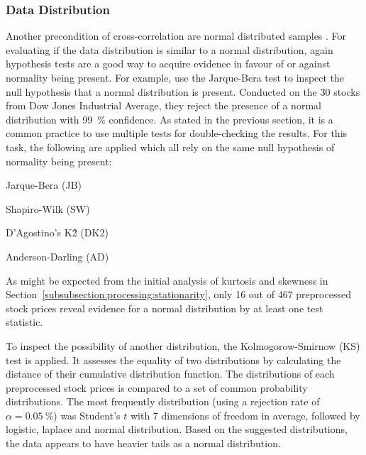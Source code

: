 \subsubsection{Data Distribution}
\label{subsubsection:normal_dist}


Another precondition of cross-correlation are normal distributed samples \cite{Bishara2012TestingApproaches}. For evaluating if the data distribution is similar to a normal distribution, again hypothesis tests are a good way to acquire evidence in favour of or against normality being present. For example, \citet{Vlastakis2012InformationVolatility} use the Jarque-Bera test \cite{Jarque1980EfficientResiduals} to inspect the null hypothesis that a normal distribution is present. Conducted on the 30 stocks from Dow Jones Industrial Average, they reject the presence of a normal distribution with 99~\% confidence. As stated in the previous section, it is a common practice to use multiple tests for double-checking the results. For this task, the following are applied which all rely on the same null hypothesis of normality being present:
\begin{enumerate*}[label=(\roman*)]
    \item Jarque-Bera (JB) \cite{Jarque1980EfficientResiduals}
    \item Shapiro-Wilk (SW) \cite{Shapiro1965AnSamples}
    \item D’Agostino’s K\^2 (DK2) \cite{DAgostino1973Testsb}
    \item Anderson-Darling (AD) \cite{Stephens1974EDFComparisons}
\end{enumerate*}

As might be expected from the initial analysis of kurtosis and skewness in Section~\ref{subsubsection:processing:stationarity}, only 16 out of 467 preprocessed stock prices reveal evidence for a normal distribution by at least one test statistic.


To inspect the possibility of another distribution, the Kolmogorow-Smirnow (KS) \cite{Massey1951TheFit} test is applied. It assesses the equality of two distributions by calculating the distance of their cumulative distribution function. The distributions of each preprocessed stock prices is compared to a set of common probability distributions. The most frequently distribution (using a rejection rate of $\alpha=0.05~\%$) was Student's $t$ with 7 dimensions of freedom in average, followed by logistic, laplace and normal distribution. Based on the suggested distributions, the data appears to have heavier tails as a normal distribution. %

